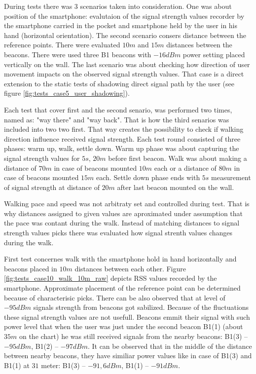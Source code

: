 \documentclass[../main.tex]{subfiles}
\begin{document}
During tests there was 3 scenarios taken into consideration. One was about position of the smartphone: evalutaion of the signal strength values recorder by the smartphone carried in the pocket and smartphone held by the user in his hand (horizontal orientation). The second scenario consers distance between the reference points. There were evaluated $10m$ and $15m$ distances between the beacons. There were used three B1 beacons with $-16dBm$ power setting placed vertically on the wall. The last scenario was about checking how direction of user movement impacts on the observed signal strength values. That case is a direct extension to the static tests of shadowing direct signal path by the user (see figure \ref{fig:tests_case5_user_shadowing}).

Each test that cover first and the second senario, was performed two times, named as: "way there" and "way back". That is how the third senarios was included into two two first. That way creates the possibility to check if walking direction influence received signal strength. Each test round consisted of three phases: warm up, walk, settle down. Warm up phase was about capturing the signal strength values for $5s$, $20m$ before first beacon. Walk was about making a distance of $70m$ in case of beacons mounted $10m$ each or a distance of $80m$ in case of beacons mounted $15m$ each. Settle down phase ends with $5s$ measurement of signal strength at distance of $20m$ after last beacon mounted on the wall.

Walking pace and speed was not arbitraty set and controlled during test. That is why distances assigned to given values are aproximated under assumption that the pace was contant during the walk. Instead of matching distances to signal strength values picks there was evaluated how signal strenth values changes during the walk.


First test concernes walk with the smartphone hold in hand horizontally and beacons placed in $10m$ distances between each other. Figure \ref{fig:tests_case10_walk_10m_raw} depicts RSS values recorded by the smartphone. Approximate placement of the reference point can be determined because of characterisic picks. There can be also observed that at level of $-95dBm$ signals strength from beacons got sabilized. Because of the fluctuations these signal strength values are not usefull. Beacons emmit their signal with such power level that when the user was just under the second beacon B1(1) (about $35m$ on the chart) he was still received signals from the nearby beacons: B1(3) -- $-95dBm$, B1(2) -- $-97dBm$. It can be observed that in the middle of the distance between nearby beacons, they have similiar power values like in case of B1(3) and B1(1) at $31$ meter: B1(3) -- $-91,6dBm$, B1(1) -- $-91dBm$.
\end{document}
